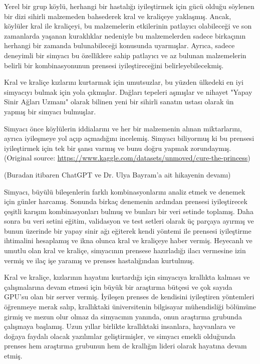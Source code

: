 \documentclass[11pt]{article}
\begin{document}
Yerel bir grup köylü, herhangi bir hastalığı iyileştirmek için gücü olduğu söylenen bir dizi sihirli malzemeden bahsederek kral ve kraliçeye yaklaşmış. Ancak, köylüler kral ile kraliçeyi, bu malzemelerin etkilerinin patlayıcı olabileceği ve son zamanlarda yaşanan kuraklıklar nedeniyle bu malzemelerden sadece birkaçının herhangi bir zamanda bulunabileceği konusunda uyarmışlar. Ayrıca, sadece deneyimli bir simyacı bu özelliklere sahip patlayıcı ve az bulunan malzemelerin belirli bir kombinasyonunun prensesi iyileştireceğini belirleyebilecekmiş.

Kral ve kraliçe kızlarını kurtarmak için umutsuzlar, bu yüzden ülkedeki en iyi simyacıyı bulmak için yola çıkmışlar. Dağları tepeleri aşmışlar ve nihayet "Yapay Sinir Ağları Uzmanı" olarak bilinen yeni bir sihirli sanatın ustası olarak ün yapmış bir simyacı bulmuşlar.

Simyacı önce köylülerin iddialarını ve her bir malzemenin alınan miktarlarını, ayrıca iyileşmeye yol açıp açmadığını incelemiş. Simyacı biliyormuş ki bu prensesi iyileştirmek için tek bir şansı varmış ve bunu doğru yapmak zorundaymış. (Original source: \url{https://www.kaggle.com/datasets/unmoved/cure-the-princess})

(Buradan itibaren ChatGPT ve Dr. Ulya Bayram'a ait hikayenin devamı)

Simyacı, büyülü bileşenlerin farklı kombinasyonlarını analiz etmek ve denemek için günler harcamış. Sonunda birkaç denemenin ardından prensesi iyileştirecek çeşitli karışım kombinasyonları bulmuş ve bunları bir veri setinde toplamış. Daha sonra bu veri setini eğitim, validasyon ve test setleri olarak üç parçaya ayırmış ve bunun üzerinde bir yapay sinir ağı eğiterek kendi yöntemi ile prensesi iyileştirme ihtimalini hesaplamış ve ikna olunca kral ve kraliçeye haber vermiş. Heyecanlı ve umutlu olan kral ve kraliçe, simyacının prensese hazırladığı ilacı vermesine izin vermiş ve ilaç işe yaramış ve prenses hastalığından kurtulmuş.

Kral ve kraliçe, kızlarının hayatını kurtardığı için simyacıya krallıkta kalması ve çalışmalarına devam etmesi için büyük bir araştırma bütçesi ve çok sayıda GPU'su olan bir server vermiş. İyileşen prenses de kendisini iyileştiren yöntemleri öğrenmeye merak salıp, krallıktaki üniversitenin bilgisayar mühendisliği bölümüne girmiş ve mezun olur olmaz da simyacının yanında, onun araştırma grubunda çalışmaya başlamış. Uzun yıllar birlikte krallıktaki insanlara, hayvanlara ve doğaya faydalı olacak yazılımlar geliştirmişler, ve simyacı emekli olduğunda prenses hem araştırma grubunun hem de krallığın lideri olarak hayatına devam etmiş.
\end{document}
